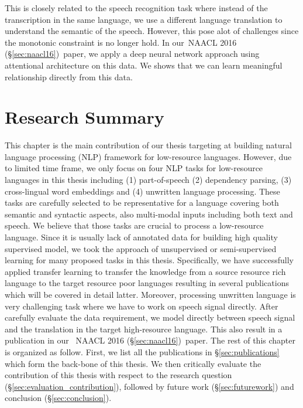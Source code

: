 \documentclass[12pt,twoside,final,hidelinks]{ltthesis}
\theoremstyle{definition}
\newcommand\naaclvi{NAACL 2016 (\S\ref{sec:naacl16})}
\begin{document}
This is closely related to the speech recognition task where instead of the transcription in the same language, we use a different language translation to understand the semantic of the speech. However, this pose alot of challenges since the monotonic constraint is no longer hold. In our~\naaclvi\ paper, we apply a deep neural network approach using attentional architecture on this data. We shows that we can learn meaningful relationship directly from this data.   


\chapter{Research Summary}
This chapter is the main contribution of our thesis targeting at building natural language processing (NLP) framework for low-resource languages. 
However, due to limited time frame, we only focus on four NLP tasks 
for low-resource languages in this thesis including (1) part-of-speech  (2) dependency parsing, (3) cross-lingual word embeddings and (4) unwritten 
language processing. These tasks are carefully selected to be representative for a language covering both semantic and syntactic aspects, also 
multi-modal inputs including both text and speech. We believe that those tasks are crucial to process a low-resource language.  
Since it is usually lack of annotated data for building high quality supervised model, we took the approach of 
unsupervised or semi-supervised learning for many proposed tasks in this thesis. Specifically, we have successfully applied transfer learning 
to transfer the knowledge from a source resource rich language to the target resource poor languages resulting in several publications which will be 
covered in detail latter. Moreover, processing unwritten language is very challenging task where we have to work on speech signal directly. After
carefully evaluate the data requirement, we model directly between speech signal and the translation in the target high-resource language. This also 
result in a publication in our ~\naaclvi\ paper.
The rest of this chapter is organized as follow. First, we list all the publications in \S\ref{sec:publications} which form the back-bone of this thesis. 
We then critically evaluate the contribution of this thesis with respect to the research question (\S\ref{sec:evaluation_contribution}), followed by 
future work (\S\ref{sec:futurework}) and conclusion (\S\ref{sec:conclusion}). 
\end{document}
